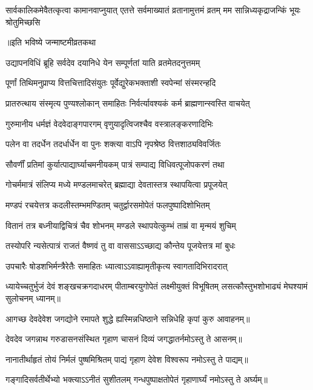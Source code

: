 \threelineshloka
{सार्वकालिकमेवैतत्कृत्वा कामानवाप्नुयात्}
{एतत्ते सर्वमाख्यातं व्रतानामुत्तमं व्रतम्}
{मम सान्निध्यकृद्राजन्किं भूयः श्रोतुमिच्छसि}%

\centerline{॥इति भविष्ये जन्माष्टमीव्रतकथा}



\twolineshloka
{उद्यापनविधिं ब्रूहि सर्वदेव दयानिधे}
{येन सम्पूर्णतां याति व्रतमेतदनुत्तमम्}

\twolineshloka
{पूर्णां तिथिमनुप्राप्य वित्तचित्तादिसंयुतः}
{पूर्वेद्युरेकभक्ताशी स्वपेन्मां संस्मरन्हदि}

\twolineshloka
{प्रातरुत्थाय संस्मृत्य पुण्यश्लोकान् समाहितः}
{निर्वर्त्यावश्यकं कर्म ब्राह्मणान्स्वस्ति वाचयेत्}

\twolineshloka
{गुरुमानीय धर्मज्ञं वेदवेदाङ्गपारगम्}
{वृणुयादृत्विजश्चैव वस्त्रालङ्करणादिभिः}

\twolineshloka
{पलेन वा तदर्धेन तदर्धार्धेन वा पुनः}
{शक्त्या वाऽपि नृपश्रेष्ठ वित्तशाठ्यविवर्जितः}

\twolineshloka
{सौवर्णीं प्रतिमां कुर्यात्पाद्यार्घ्याचमनीयकम्}
{पात्रं सम्पाद्य विधिवत्पूजोपकरणं तथा}

\twolineshloka
{गोचर्ममात्रं संलिप्य मध्ये मण्डलमाचरेत्}
{ब्रह्माद्या देवतास्तत्र स्थापयित्वा प्रपूजयेत्}

\twolineshloka
{मण्डपं रचयेत्तत्र कदलीस्तम्भमण्डितम्}
{चतुर्द्वारसमोपेतं फलपुष्पादिशोभितम्}

\twolineshloka
{वितानं तत्र बध्नीयाद्विचित्रं चैव शोभनम्}
{मण्डले स्थापयेत्कुम्भं ताम्रं वा मृन्मयं शुचिम्}

\twolineshloka
{तस्योपरि न्यसेत्पात्रं राजतं वैष्णवं तु वा}
{वाससाऽऽच्छाद्य कौन्तेय पूजयेत्तत्र मां बुधः}

\twolineshloka
{उपचारैः षोडशभिर्मन्त्रैरेतैः समाहितः}
{ध्यात्वाऽऽवाह्यामृतीकृत्य स्वागतादिभिरादरात्}

\threelineshloka
{ध्यायेच्चतुर्भुजं देवं शङ्खचक्रगदाधरम्}
{पीताम्बरयुगोपेतं लक्ष्मीयुक्तं विभूषितम्}
{लसत्कौस्तुभशोभाढ्यं मेघश्यामं सुलोचनम्}
ध्यानम्॥

\twolineshloka
{आगच्छ देवदेवेश जगद्योने रमापते}
{शुद्धे ह्यस्मिन्नधिष्ठाने सन्निधेहि कृपां कुरु}
आवाहनम्॥

\twolineshloka
{देवदेव जगन्नाथ गरुडासनसंस्थित}
{गृहाण चासनं दिव्यं जगद्धातर्नमोऽस्तु ते}
आसनम्॥

\twolineshloka
{नानातीर्थाहृतं तोयं निर्मलं पुष्षमिश्रितम्}
{पाद्यं गृहाण देवेश विश्वरूप नमोऽस्तु ते}
पाद्यम्॥

\twolineshloka
{गङ्गादिसर्वतीर्थेभ्यो भक्त्याऽऽनीतं सुशीतलम्}
{गन्धपुष्पाक्षतोपेतं गृहाणार्घ्यं नमोऽस्तु ते}
अर्घ्यम्॥

